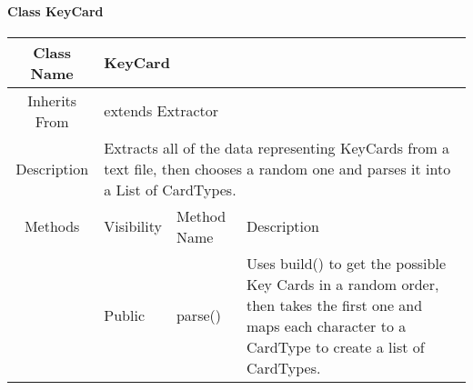 \paragraph{Class KeyCard}\mbox{}

\begin{tabularx}{\textwidth}{|c||l|l|l|X|}
    \hline
    \cellcolor{lightgray}Class Name & \multicolumn{4}{X|}{KeyCard}\\
    \hline
    \cellcolor{lightgray}Inherits From & \multicolumn{4}{X|}{extends Extractor}\\
    \hline
    \cellcolor{lightgray}Description & \multicolumn{4}{p{12cm}|}{Extracts all of the data representing KeyCards from a text file, then chooses a random one and parses it into a List of CardTypes.}\\
    \hline\hline
    
    \cellcolor{lightgray}Methods & \cellcolor{lightgray}Visibility & \multicolumn{2}{l|}{\cellcolor{lightgray}Method Name} & \cellcolor{lightgray}Description\\\cline{2-5}
    \hline
    \cellcolor{lightgray} & Public & \multicolumn{2}{l|}{parse()} & Uses build() to get the possible Key Cards in a random order, then takes the first one and maps each character to a CardType to create a list of CardTypes.\\
    \hline
\end{tabularx}